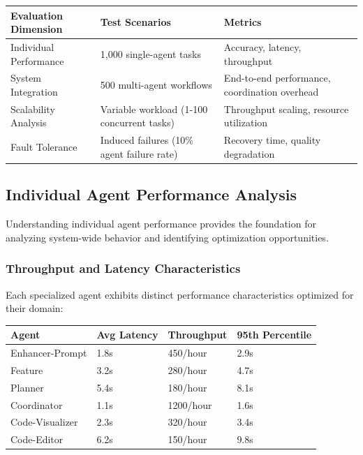 \begin{center}
\begin{tabular}{@{}lll@{}}
\toprule
\textbf{Evaluation Dimension} & \textbf{Test Scenarios} & \textbf{Metrics} \\
\midrule
Individual Performance & 1,000 single-agent tasks & Accuracy, latency, throughput \\
System Integration & 500 multi-agent workflows & End-to-end performance, coordination overhead \\
Scalability Analysis & Variable workload (1-100 concurrent tasks) & Throughput scaling, resource utilization \\
Fault Tolerance & Induced failures (10\% agent failure rate) & Recovery time, quality degradation \\
\bottomrule
\end{tabular}
\end{center}

\subsection*{Individual Agent Performance Analysis}

Understanding individual agent performance provides the foundation for analyzing system-wide behavior and identifying optimization opportunities.

\subsubsection*{Throughput and Latency Characteristics}

Each specialized agent exhibits distinct performance characteristics optimized for their domain:

\begin{center}
\begin{tabular}{@{}llll@{}}
\toprule
\textbf{Agent} & \textbf{Avg Latency} & \textbf{Throughput} & \textbf{95th Percentile} \\
\midrule
Enhancer-Prompt & 1.8s & 450/hour & 2.9s \\
Feature & 3.2s & 280/hour & 4.7s \\
Planner & 5.4s & 180/hour & 8.1s \\
Coordinator & 1.1s & 1200/hour & 1.6s \\
Code-Visualizer & 2.3s & 320/hour & 3.4s \\
Code-Editor & 6.2s & 150/hour & 9.8s \\
\bottomrule
\end{tabular}
\end{center}


